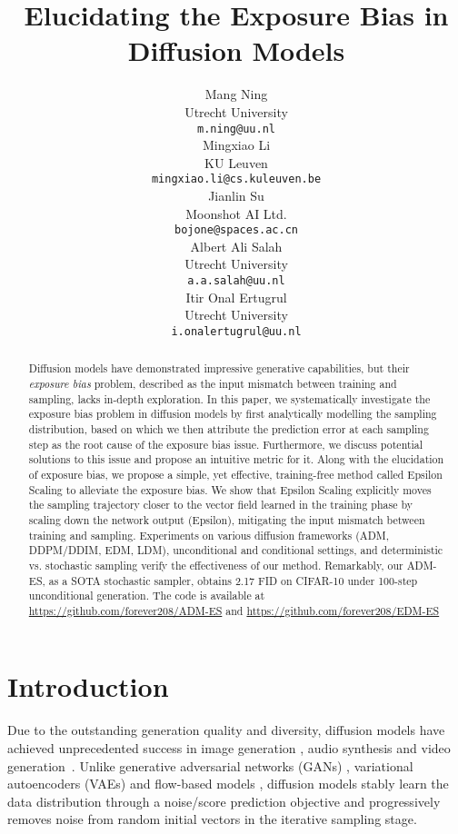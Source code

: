 \documentclass{article} \usepackage{iclr2024_conference,times}
\title{Elucidating the Exposure Bias in Diffusion Models}
\author{
Mang Ning \\  
Utrecht University\\
\texttt{m.ning@uu.nl} \\
\And
Mingxiao Li \\
KU Leuven\\
\texttt{mingxiao.li@cs.kuleuven.be} \\
\AND
Jianlin Su \\
Moonshot AI Ltd.\\
\texttt{bojone@spaces.ac.cn} \\
\And
Albert Ali Salah \\
Utrecht University\\
\texttt{a.a.salah@uu.nl} \\
\And
Itir Onal Ertugrul \\
Utrecht University\\
\texttt{i.onalertugrul@uu.nl} \\
}
\begin{document}
\maketitle

\begin{abstract}
Diffusion models have demonstrated impressive generative capabilities, but their \textit{exposure bias} problem, described as the input mismatch between training and sampling, lacks in-depth exploration. In this paper, we systematically investigate the exposure bias problem in diffusion models by first analytically modelling the sampling distribution, based on which we then attribute the prediction error at each sampling step as the root cause of the exposure bias issue. Furthermore, we discuss potential solutions to this issue and propose an intuitive metric for it. Along with the elucidation of exposure bias, we propose a simple, yet effective, training-free method called Epsilon Scaling to alleviate the exposure bias. We show that Epsilon Scaling explicitly moves the sampling trajectory closer to the vector field learned in the training phase by scaling down the network output (Epsilon), mitigating the input mismatch between training and sampling. Experiments on various diffusion frameworks (ADM, DDPM/DDIM, EDM, LDM), unconditional and conditional settings, and deterministic vs. stochastic sampling verify the effectiveness of our method. Remarkably, our ADM-ES, as a SOTA stochastic sampler, obtains 2.17 FID on CIFAR-10 under 100-step unconditional generation. The code is available at \url{https://github.com/forever208/ADM-ES} and \url{https://github.com/forever208/EDM-ES}
\end{abstract}



\section{Introduction}
Due to the outstanding generation quality and diversity, diffusion models \citep{pmlr-v37-sohl-dickstein15,DDPM,song2019generative} have achieved unprecedented success in image generation \citep{ADM,nichol2022glide,LDM,Imagen}, audio synthesis \citep{diffwave,wavegrad} and video generation~\citep{ho2022imagen}. Unlike generative adversarial networks (GANs) \citep{GAN}, variational autoencoders (VAEs) \citep{VAE} and flow-based models \citep{NICE,NVP}, diffusion models stably learn the data distribution through a noise/score prediction objective and progressively removes noise from random initial vectors in the iterative sampling stage. 
\end{document}
